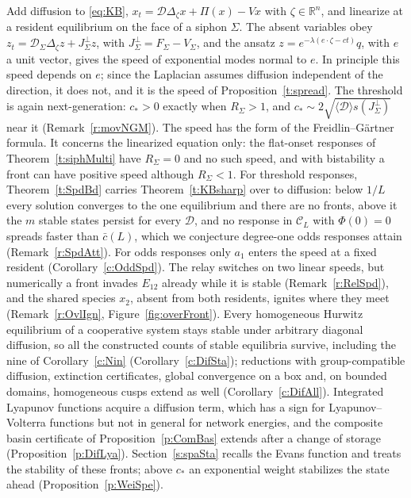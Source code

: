 \begin{enumerate}
\ifdefined\withSpatial
{}
Add diffusion to \eqref{eq:KB}, $x_t=\mathcal D\Delta_\zeta x+\Pi(x)-Vx$ with $\zeta\in\mathbb R^n$, and linearize at a resident equilibrium on the face of a siphon
$\Sigma$. The absent variables obey $z_t=\mathcal D_\Sigma\Delta_\zeta z+J_\Sigma^\perp z$, with $J_\Sigma^\perp=F_\Sigma-V_\Sigma$, and the ansatz
$z=e^{-\lambda(e\cdot\zeta-ct)}q$, with $e$ a unit vector, gives the speed of exponential modes normal to $e$. In principle this speed depends on $e$; since the Laplacian assumes diffusion independent of the direction, it does not, and it is the speed of Proposition~\ref{t:spread}. The threshold is again next-generation: $c_*>0$ exactly when
$R_\Sigma>1$, and $c_*\sim2\sqrt{\langle\mathcal D\rangle s(J_\Sigma^\perp)}$ near it (Remark~\ref{r:movNGM}). The speed has the form of the
Freidlin--G\"artner formula. It concerns the linearized equation only: the flat-onset responses of Theorem~\ref{t:siphMulti} have
$R_\Sigma=0$ and no such speed, and with bistability a front can have positive speed although $R_\Sigma<1$.
For threshold responses, Theorem~\ref{t:SpdBd} carries Theorem~\ref{t:KBsharp} over to diffusion: below $1/L$ every solution converges to the
one equilibrium and there are no fronts, above it the $m$ stable states persist for every $\mathcal D$, and no response in $\mathcal C_L$ with $\Phi(0)=0$ spreads faster
than $\bar c(L)$, which we conjecture degree-one odds responses attain (Remark~\ref{r:SpdAtt}). For odds responses only $a_1$ enters the speed at a fixed resident
(Corollary~\ref{c:OddSpd}). The relay switches on two linear speeds, but numerically a front invades $E_{12}$ already while it is stable (Remark~\ref{r:RelSpd}), and the shared species $x_2$, absent from both residents, ignites where they meet (Remark~\ref{r:OvlIgn}, Figure~\ref{fig:overFront}). Every homogeneous Hurwitz equilibrium of a cooperative system stays stable under arbitrary diagonal diffusion, so all the constructed counts of stable equilibria survive, including the nine of Corollary~\ref{c:Nin} (Corollary~\ref{c:DifSta}); reductions with group-compatible diffusion, extinction certificates, global convergence on a box and, on bounded domains, homogeneous cusps extend as well (Corollary~\ref{c:DifAll}). Integrated Lyapunov functions acquire a diffusion term, which has a sign for Lyapunov--Volterra functions but not in general for network energies, and the composite basin certificate of Proposition~\ref{p:ComBas} extends after a change of storage (Proposition~\ref{p:DifLya}). Section~\ref{s:spaSta} recalls the Evans function and treats the stability of these fronts; above $c_*$ an exponential weight stabilizes the state ahead (Proposition~\ref{p:WeiSpe}).
\fi


\end{enumerate}
